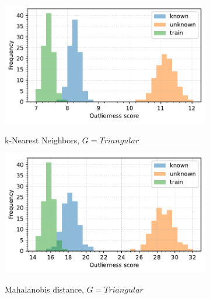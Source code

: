 \begin{figure}[t]
\begin{subfigure}[b]{0.495\textwidth}
        \label{fig:hists-md-gaussian}
    \end{subfigure}
    \begin{subfigure}[b]{0.495\textwidth}
        \centering
        \caption{\small k-Nearest Neighbors, $G = \textit{Triangular}$}
        \includegraphics[width=\textwidth]{images/distributions/hists-Gen/hist-distributions-dimension_250-samples_1000-distance_8-distribution_triangular-model_kNN-10-seed_0.pdf}
        \label{fig:hists-knn-triangular}
    \end{subfigure}
    \hfill
    \begin{subfigure}[b]{0.495\textwidth}
        \centering
        \caption{\small Mahalanobis distance, $G = \textit{Triangular}$}
        \includegraphics[width=\textwidth]{images/distributions/hists-Gen/hist-distributions-dimension_250-samples_1000-distance_8-distribution_triangular-model_MD-seed_0.pdf}
        \label{fig:hists-md-triangular}
    \end{subfigure}
    \begin{subfigure}[b]{0.495\textwidth}
        \centering

\end{subfigure}
\end{figure}
